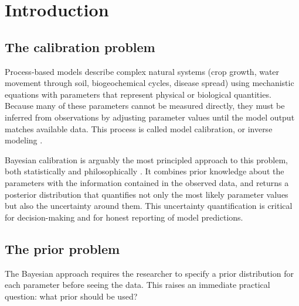 \documentclass[11pt,a4paper]{article}
\begin{document}


\vspace{1em}

\section{Introduction}

\subsection{The calibration problem}

Process-based models describe complex natural systems (crop growth, water movement through
soil, biogeochemical cycles, disease spread) using mechanistic equations with parameters that
represent physical or biological quantities. Because many of these parameters cannot be measured
directly, they must be inferred from observations by adjusting parameter values until the model
output matches available data. This process is called model calibration, or inverse modeling \citep{Hollos2022}.

Bayesian calibration is arguably the most principled approach to this
problem, both statistically and philosophically \citep{Gelman2013}. It combines prior knowledge about the parameters with the information
contained in the observed data, and returns a posterior distribution that quantifies not only the
most likely parameter values but also the uncertainty around them. This uncertainty quantification
is critical for decision-making and for honest reporting of model predictions.

\subsection{The prior problem}

The Bayesian approach requires the researcher to specify a prior distribution for each parameter
before seeing the data. This raises an immediate practical question: what prior should be used?
\end{document}
